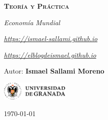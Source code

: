 \documentclass[12pt]{report} %
\begin{document}
\begin{titlepage}
    \begin{center}
        \vspace*{2cm}
        
        {\Huge \bfseries\scshape Teoría y Práctica \par}
        \vspace{0.5cm}
        {\Large \itshape Economía Mundial \par}
        \vspace{0.5cm}
        {\small \itshape \href{https://ismael-sallami.github.io}{https://ismael-sallami.github.io} \par}
        {\small \itshape \href{https://elblogdeismael.github.io}{https://elblogdeismael.github.io} \par}


        \vfill
        
        {\LARGE Autor: \textbf{Ismael Sallami Moreno} \par}
        \vspace{0.3cm}
        
        \vspace{1cm}
        \includegraphics[width=0.25\textwidth]{../../../extraFiles/img/ugr.png} %
        \vspace{1cm}
        
        {\large \today}
    \end{center}
    
    \restoregeometry
\end{titlepage}


\thispagestyle{empty} %
\clearpage

\tableofcontents
\listoffigures
\clearpage

\listoftables
\clearpage
\thispagestyle{empty} %
\clearpage

\renewcommand{\lstlistlistingname}{Índice de Código}
\lstlistoflistings
\clearpage

\renewcommand{\listtheoremname}{Índice de Ecuaciones}
\listoftheorems[ignoreall,show={equation}]
\clearpage
\end{document}
